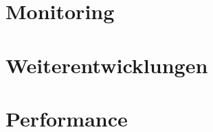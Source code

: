 

\section{Monitoring}\label{sec:monitoring-verfahren}



\section{Weiterentwicklungen}\label{sec:weiterentwicklungen}


\section{Performance}\label{sec:performance}